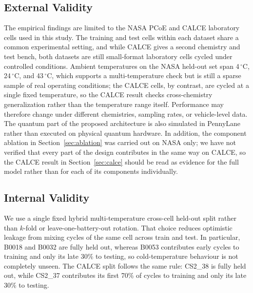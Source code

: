 \documentclass[a4paper,fleqn]{cas-sc}
\begin{document}
\subsection{External Validity}\label{sec:external}
The empirical findings are limited to the NASA PCoE and CALCE laboratory cells used in this study. The training and test cells within each dataset share a common experimental setting, and while CALCE gives a second chemistry and test bench, both datasets are still small-format laboratory cells cycled under controlled conditions.
Ambient temperatures on the NASA held-out set span 4\,$^\circ$C, 24\,$^\circ$C, and 43\,$^\circ$C, which supports a multi-temperature check but is still a sparse sample of real operating conditions; the CALCE cells, by contrast, are cycled at a single fixed temperature, so the CALCE result checks cross-chemistry generalization rather than the temperature range itself. Performance may therefore change under different chemistries, sampling rates, or vehicle-level data. 
The quantum part of the proposed architecture is also simulated in PennyLane rather than executed on physical quantum hardware.
In addition, the component ablation in Section~\ref{sec:ablation} was carried out on NASA only; we have not verified that every part of the design contributes in the same way on CALCE, so the CALCE result in Section~\ref{sec:calce} should be read as evidence for the full model rather than for each of its components individually.

\subsection{Internal Validity}\label{sec:internal}
We use a single fixed hybrid multi-temperature cross-cell held-out split rather than $k$-fold or leave-one-battery-out rotation. That choice reduces optimistic leakage from mixing cycles of the same cell across train and test.
In particular, B0018 and B0032 are fully held out, whereas B0053 contributes early cycles to training and only its late 30\% to testing, so cold-temperature behaviour is not completely unseen. The CALCE split follows the same rule: CS2\_38 is fully held out, while CS2\_37 contributes its first 70\% of cycles to training and only its late 30\% to testing.
\end{document}
